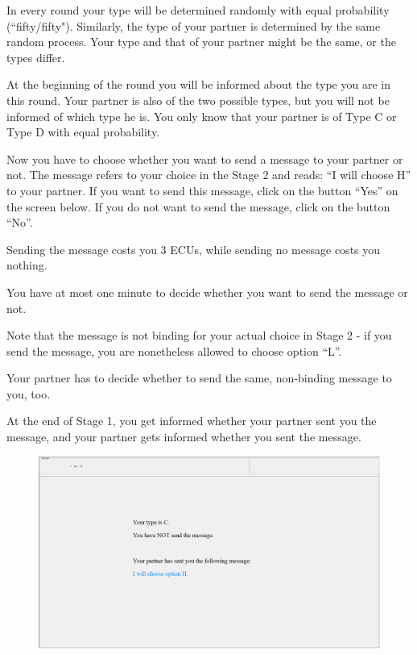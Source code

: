 \documentclass[12pt]{article}
\theoremstyle{break}
\begin{document}
In every round your type will be determined randomly with equal probability (``fifty/fifty"). Similarly, the type of your partner is determined by the same random process. Your type and that of your partner might be the same, or the types differ.

At the beginning of the round you will be informed about the type you are in this round. Your partner is also of the two possible types, but you will not be informed of which type he is. You only know that your partner is of Type C or Type D with equal probability.

Now you have to choose whether you want to send a message to your partner or not. The message refers to your choice in the Stage 2 and reads: “I will choose H” to your partner. If you want to send this message, click on the button ``Yes'' on the screen below. If you do not want to send the message, click on the button ``No''. 

Sending the message costs you 3 ECUs, while sending no message costs you nothing.

You have at most one minute to decide whether you want to send the message or not. 

Note that the message is not binding for your actual choice in Stage 2 - if you send the message, you are nonetheless allowed to choose option ``L''.

Your partner has to decide whether to send the same, non-binding message to you, too.

At the end of Stage 1, you get informed whether your partner sent you the message, and your partner gets informed whether you sent the message. 

\begin{figure}[h]
  \centering
    \includegraphics[width=.9\textwidth]{fig2-CT-instructions.png}
\label{fig:fig2-CT-instructions}
\end{figure}
\end{document}
